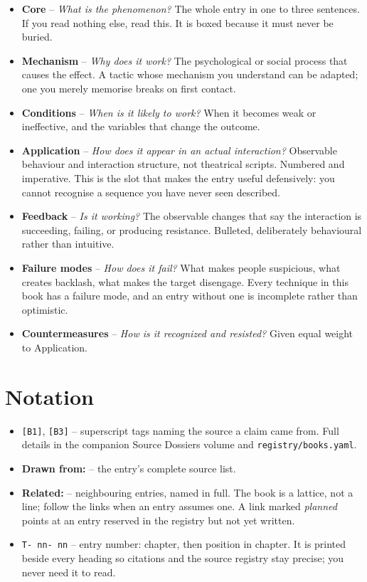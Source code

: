 \begingroup\small
\begin{itemize}
\item \textbf{Core} -- \emph{What is the phenomenon?} The whole entry in
  one to three sentences. If you read nothing else, read this. It is
  boxed because it must never be buried.
\item \textbf{Mechanism} -- \emph{Why does it work?} The psychological or
  social process that causes the effect. A tactic whose mechanism you
  understand can be adapted; one you merely memorise breaks on first
  contact.
\item \textbf{Conditions} -- \emph{When is it likely to work?} When it
  becomes weak or ineffective, and the variables that change the outcome.
\item \textbf{Application} -- \emph{How does it appear in an actual
  interaction?} Observable behaviour and interaction structure, not
  theatrical scripts. Numbered and imperative. This is the slot that
  makes the entry useful defensively: you cannot recognise a sequence
  you have never seen described.
\item \textbf{Feedback} -- \emph{Is it working?} The observable changes
  that say the interaction is succeeding, failing, or producing
  resistance. Bulleted, deliberately behavioural rather than intuitive.
\item \textbf{Failure modes} -- \emph{How does it fail?} What makes
  people suspicious, what creates backlash, what makes the target
  disengage. Every technique in this book has a failure mode, and an
  entry without one is incomplete rather than optimistic.
\item \textbf{Countermeasures} -- \emph{How is it recognized and
  resisted?} Given equal weight to Application.
\end{itemize}
\par\endgroup

\section*{Notation}

\begingroup\small
\begin{itemize}
\item \texttt{[B1]}, \texttt{[B3]} -- superscript tags naming the source a
  claim came from. Full details in the companion Source Dossiers volume and \texttt{registry/books.yaml}.
\item \textbf{Drawn from:} -- the entry's complete source list.
\item \textbf{Related:} -- neighbouring entries, named in full. The book is
  a lattice, not a line; follow the links when an entry assumes one. A
  link marked \emph{planned} points at an entry reserved in the registry
  but not yet written.
\item \texttt{T-\,nn-\,nn} -- entry number: chapter, then position in
  chapter. It is printed beside every heading so citations and the source
  registry stay precise; you never need it to read.
\end{itemize}
\par\endgroup

